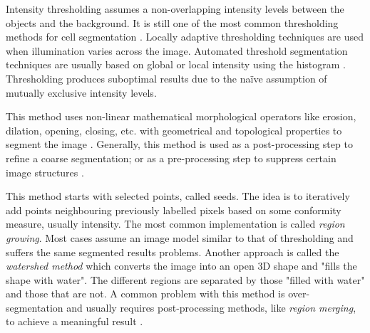 \begin{definition}
	Intensity thresholding assumes a non-overlapping intensity levels between the objects and the background.
	It is still one of the most common thresholding methods for cell segmentation \citep{WuMerchantCastleman2008,Meijering2004,Quanli2011}.
	Locally adaptive thresholding techniques are used when illumination varies across the image.
	Automated threshold segmentation techniques are usually based on global or local intensity using the histogram \citep{Bengtsson2004}.
	Thresholding produces suboptimal results due to the na{\"i}ve assumption of mutually exclusive intensity levels.
\end{definition}

\begin{definition}
	This method uses non-linear mathematical morphological operators like erosion, dilation, opening, closing, etc. with geometrical and topological properties to segment the image \citep{GonzalezWoods2002,Meijering2004,Dorini2007,Anoraganingrum1999,Kumar2002}.
	Generally, this method is used as a post-processing step to refine a coarse segmentation; or as a pre-processing step to suppress certain image structures \citep{Bengtsson2004}.
\end{definition}

\begin{definition}
	This method starts with selected points, called seeds.
	The idea is to iteratively add points neighbouring previously labelled pixels based on some conformity measure, usually intensity.
	The most common implementation is called \textit{region growing}.
	Most cases assume an image model similar to that of thresholding and suffers the same segmented results problems.
	Another approach is called the \textit{watershed method} which converts the image into an open 3D shape and "fills the shape with water".
	The different regions are separated by those "filled with water" and those that are not.
	A common problem with this method is over-segmentation and usually requires post-processing methods, like \textit{region merging}, to achieve a meaningful result \citep{Jiang2003,Lin2003,Bengtsson2004}.
\end{definition}

